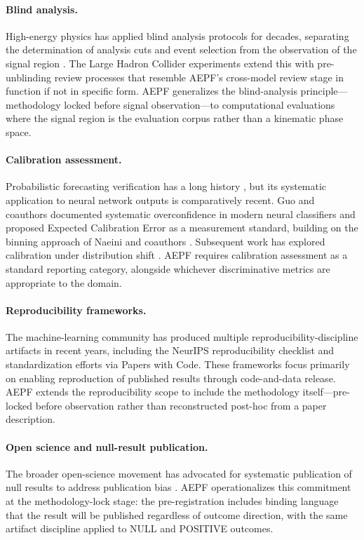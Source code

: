 \documentclass[11pt]{article}
\begin{document}
\paragraph{Blind analysis.}
High-energy physics has applied blind analysis protocols for
decades, separating the determination of analysis cuts and event
selection from the observation of the signal region
\cite{klein2005blind}. The Large Hadron Collider experiments extend
this with pre-unblinding review processes that resemble AEPF's
cross-model review stage in function if not in specific form. AEPF
generalizes the blind-analysis principle---methodology locked
before signal observation---to computational evaluations where the
signal region is the evaluation corpus rather than a kinematic
phase space.

\paragraph{Calibration assessment.}
Probabilistic forecasting verification has a long history
\cite{brier1950}, but its systematic application to neural network
outputs is comparatively recent. Guo and coauthors documented
systematic overconfidence in modern neural classifiers
\cite{guo2017calibration} and proposed Expected Calibration Error
as a measurement standard, building on the binning approach of
Naeini and coauthors \cite{naeini2015ece}. Subsequent work has
explored calibration under distribution shift
\cite{minderer2021revisiting}. AEPF requires calibration assessment
as a standard reporting category, alongside whichever discriminative
metrics are appropriate to the domain.

\paragraph{Reproducibility frameworks.}
The machine-learning community has produced multiple
reproducibility-discipline artifacts in recent years, including the
NeurIPS reproducibility checklist \cite{pineau2021reproducibility}
and standardization efforts via Papers with Code. These frameworks
focus primarily on enabling reproduction of published results
through code-and-data release. AEPF extends the reproducibility
scope to include the methodology itself---pre-locked before
observation rather than reconstructed post-hoc from a paper
description.

\paragraph{Open science and null-result publication.}
The broader open-science movement \cite{nosek2015open} has
advocated for systematic publication of null results to address
publication bias \cite{ioannidis2005}. AEPF operationalizes this
commitment at the methodology-lock stage: the pre-registration
includes binding language that the result will be published
regardless of outcome direction, with the same artifact discipline
applied to NULL and POSITIVE outcomes.
\end{document}
